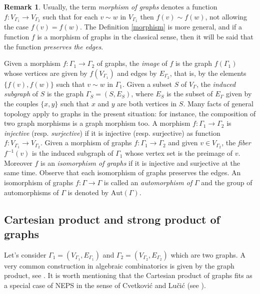 \documentclass{amsart}
\theoremstyle{definition}
\newtheorem{rem}[theo]{Remark}
\numberwithin{equation}{section}
\begin{document}
\begin{rem}
Usually, the term \textit{morphism of graphs} denotes a function $f: V_{\Gamma_1} \longrightarrow V_{\Gamma_2}$ such that for each $v \sim w$ in $V_{\Gamma_1}$ then $f(v) \sim f(w)$, not allowing the case $f(v) = f(w)$. The Definition \ref{morphism} is more general, and if a function $f$ is a morphism of graphs in the classical sense, then it will be said that the function \textit{preserves the edges}.
\end{rem}


Given a morphism  $f: \Gamma_1 \longrightarrow \Gamma_2$ of graphs, the \textit{image} of $f$ is the graph $f(\Gamma_1)$ whose vertices are given by $f(V_{\Gamma_1})$ and  edges by $E_{\Gamma_2}$, that is,   by the elements $\{f(v), f(w)\}$ such that $v \sim w$ in $\Gamma_1$. Given a subset $S$ of $V_\Gamma$, the \textit{induced subgraph} of $S$ is the graph $\Gamma_S = (S, E_S)$, where $E_S$ is the subset of $E_\Gamma$ given by the couples $\{x,y\}$ such that $x$ and $y$ are both vertices in $S$. Many facts of general topology apply to graphs in the present situation: for instance, the composition of two graph morphisms is a graph morphism too. A morphism  $f: \Gamma_1 \longrightarrow \Gamma_2$ is \textit{injective} (resp. \textit{surjective}) if it is injective (resp. surjective) as function $f:V_{\Gamma_1} \longrightarrow V_{\Gamma_2}$. Given a morphism of graphs $f:\Gamma_1 \longrightarrow \Gamma_2$ and given $v \in V_{\Gamma_2}$, the \textit{fiber} $f^{-1}(v)$ is the induced subgraph of $\Gamma_1$ whose vertex set is the preimage of $v$. Moreover $f$ is an \textit{isomorphism of graphs} if it is injective and surjective at the same time. Observe that each isomorphism of graphs preserves the edges. An isomorphism of graphs $f: \Gamma \longrightarrow \Gamma$ is called an \textit{automorphism of} $\Gamma$ and the group of automorphisms of $\Gamma$ is denoted by $\mathrm{Aut}(\Gamma)$.







\subsection{Cartesian product and strong product of graphs}
Let's consider $\Gamma_1 = (V_{\Gamma_1}, E_{\Gamma_1})$ and $\Gamma_2 = (V_{\Gamma_2}, E_{\Gamma_2})$ which are two graphs.  A very common construction in algebraic combinatorics is given by the graph product, see \cite{bddr,  sab}. It is  worth mentioning that the Cartesian product of graphs fits as a special case of NEPS  in the sense of Cvetkovi\'{c} and  Lu\v{c}i\'{c} (see \cite{neps1, neps2}).
\end{document}
